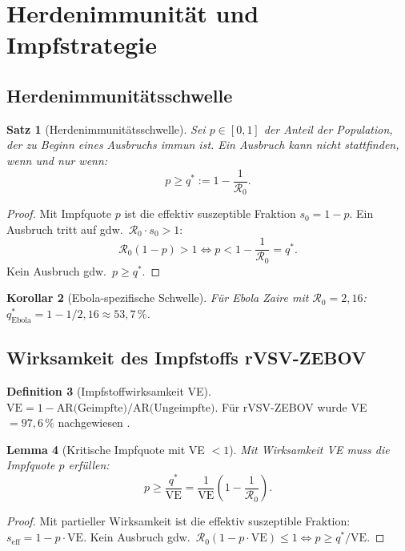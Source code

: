 ﻿\documentclass[12pt,a4paper]{article}
\theoremstyle{definition}
\newtheorem{definition}{Definition}[section]
\theoremstyle{plain}
\newtheorem{satz}[definition]{Satz}
\newtheorem{lemma}[definition]{Lemma}
\newtheorem{korollar}[definition]{Korollar}
\theoremstyle{remark}
\begin{document}
\section{Herdenimmunität und Impfstrategie}

\subsection{Herdenimmunitätsschwelle}

\begin{satz}[Herdenimmunitätsschwelle]
\label{satz:herd}
Sei $p \in [0,1]$ der Anteil der Population, der zu Beginn eines Ausbruchs immun ist.
Ein Ausbruch kann nicht stattfinden, wenn und nur wenn:
\[
  p \geq q^* := 1 - \frac{1}{\mathcal{R}_0}.
\]
\end{satz}

\begin{proof}
Mit Impfquote $p$ ist die effektiv suszeptible Fraktion $s_0 = 1 - p$.
Ein Ausbruch tritt auf gdw.\ $\mathcal{R}_0 \cdot s_0 > 1$:
\[
  \mathcal{R}_0(1-p) > 1 \Leftrightarrow p < 1 - \frac{1}{\mathcal{R}_0} = q^*.
\]
Kein Ausbruch gdw.\ $p \geq q^*$.
\end{proof}

\begin{korollar}[Ebola-spezifische Schwelle]
Für Ebola Zaire mit $\mathcal{R}_0 = 2{,}16$:
$q^*_{\text{Ebola}} = 1 - 1/2{,}16 \approx 53{,}7\,\%$.
\end{korollar}

\subsection{Wirksamkeit des Impfstoffs rVSV-ZEBOV}

\begin{definition}[Impfstoffwirksamkeit VE]
$\text{VE} = 1 - \text{AR(Geimpfte)}/\text{AR(Ungeimpfte)}$.
Für rVSV-ZEBOV wurde VE $= 97{,}6\,\%$ nachgewiesen \cite{henao2017}.
\end{definition}

\begin{lemma}[Kritische Impfquote mit VE $< 1$]
Mit Wirksamkeit VE muss die Impfquote $p$ erfüllen:
\[
  p \geq \frac{q^*}{\text{VE}} = \frac{1}{\text{VE}}\!\left(1 - \frac{1}{\mathcal{R}_0}\right).
\]
\end{lemma}

\begin{proof}
Mit partieller Wirksamkeit ist die effektiv suszeptible Fraktion:
$s_{\text{eff}} = 1 - p \cdot \text{VE}$.
Kein Ausbruch gdw.\ $\mathcal{R}_0(1 - p \cdot \text{VE}) \leq 1
\Leftrightarrow p \geq q^*/\text{VE}$.
\end{proof}
\end{document}
